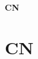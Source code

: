 \ifsolo
    ~

    \vspace{1cm}

    \begin{center}
        \textbf{\LARGE CN} \\[1em]
    \end{center}

    \vspace{1cm}

    \tableofcontents

    \vspace{1cm}

\else
    \chapter{CN}

    \minitoc
\fi
\thispagestyle{empty}
